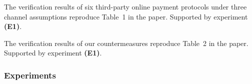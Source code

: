 \begin{compactdesc}

    \item[(C1):] The verification results of six third-party online payment protocols under three channel assumptions reproduce Table~1 in the paper. Supported by experiment \textbf{(E1)}.

    \item[(C2):] The verification results of our countermeasures reproduce Table~2 in the paper. Supported by experiment \textbf{(E1)}.


\end{compactdesc}

\subsubsection{Experiments}

